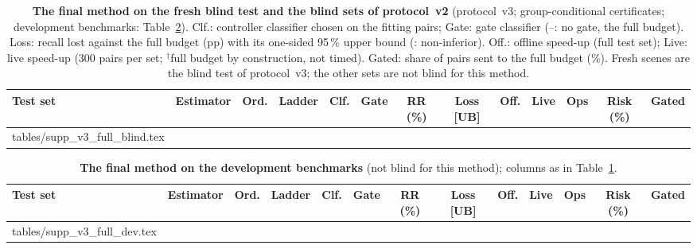 \documentclass[10pt,twocolumn,letterpaper]{article}
\makeatletter
\newcommand{\cmark}{\ding{51}}
\newenvironment{fitbox}{\adjustbox{max width=\linewidth}\bgroup}{\egroup}  %
\newcommand{\tablebody}[1]{\@@input #1 } %
\makeatother
\begin{document}
\begin{table}[t]
\centering\footnotesize\setlength{\tabcolsep}{3pt}
\caption{\textbf{The final method on the fresh blind test and the blind sets of protocol~v2} (protocol~v3; group-conditional certificates; development benchmarks: Table~\ref{tab:v3full2}). Clf.: controller classifier chosen on the fitting pairs; Gate: gate classifier (--: no gate, the full budget). Loss: recall lost against the full budget (pp) with its one-sided 95\,\% upper bound (\cmark: non-inferior). Off.: offline speed-up (full test set); Live: live speed-up (300 pairs per set; $^\dagger$full budget by construction, not timed). Gated: share of pairs sent to the full budget (\%). Fresh scenes are the blind test of protocol~v3; the other sets are not blind for this method.}
\label{tab:v3full}
\begin{fitbox}
\begin{tabular}{@{}lll lll ccccccc@{}}
\toprule
Test set & Estimator & Ord. & Ladder & Clf. & Gate & RR (\%) & Loss [UB] & Off. & Live & Ops & Risk (\%) & Gated\\
\midrule
\tablebody{tables/supp_v3_full_blind.tex}
\end{tabular}
\end{fitbox}
\end{table}

\begin{table}[t]
\centering\footnotesize\setlength{\tabcolsep}{3pt}
\caption{\textbf{The final method on the development benchmarks} (not blind for this method); columns as in Table~\ref{tab:v3full}.}
\label{tab:v3full2}
\begin{fitbox}
\begin{tabular}{@{}lll lll ccccccc@{}}
\toprule
Test set & Estimator & Ord. & Ladder & Clf. & Gate & RR (\%) & Loss [UB] & Off. & Live & Ops & Risk (\%) & Gated\\
\midrule
\tablebody{tables/supp_v3_full_dev.tex}
\end{tabular}
\end{fitbox}
\end{table}
\end{document}

